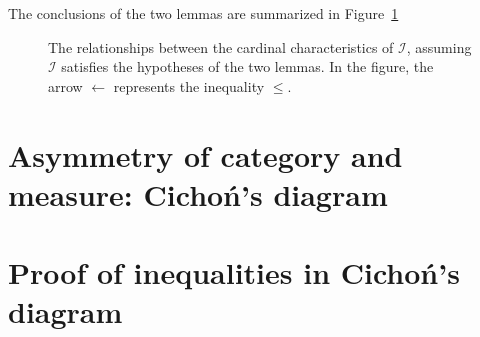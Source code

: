 \documentclass[11pt,oneside]{amsart}
\theoremstyle{definition}
\theoremstyle{definition}
\theoremstyle{remark}
\begin{document}
The conclusions of the two lemmas are summarized in Figure~\ref{fig:ideal}

\begin{figure}[h]
  \caption{The relationships between the cardinal characteristics of $\mathcal I$, assuming $\mathcal I$ satisfies the hypotheses of the two lemmas. In the figure, the arrow $\leftarrow$ represents the inequality $\leq$.\label{fig:ideal}}
\end{figure}



\section{Asymmetry of category and measure: Cicho\'n's diagram}

\section{Proof of inequalities in Cicho\'n's diagram}
\end{document}
